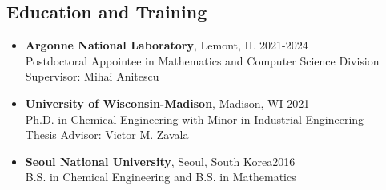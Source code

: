 \subsection*{Education and Training}
\begin{itemize}[itemsep=1pt, parsep=0pt,leftmargin=*]
\item[]
  {\bf Argonne National Laboratory}, Lemont, IL \hfill 2021-2024\\
  Postdoctoral Appointee in {Mathematics and Computer Science Division} \\
  Supervisor: Mihai Anitescu
\item[]
  {\bf University of Wisconsin-Madison}, Madison, WI \hfill 2021\\
  {Ph.D. in Chemical Engineering} with {Minor in Industrial Engineering}\\
  Thesis Advisor: Victor M. Zavala
\item[]
  {\bf Seoul National University}, Seoul, South Korea\hfill 2016 \\
  {B.S. in Chemical Engineering} and {B.S. in Mathematics}
\end{itemize}

